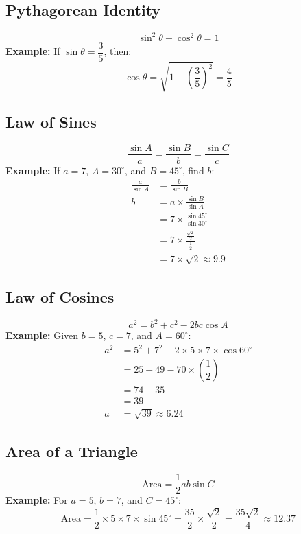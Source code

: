 \documentclass{article}
\begin{document}
\begin{multicols}{2}
\subsection*{Pythagorean Identity}
\[
\sin^2 \theta + \cos^2 \theta = 1
\]
\textbf{Example:} If \( \sin \theta = \dfrac{3}{5} \), then:
\[
\cos \theta = \sqrt{1 - \left( \dfrac{3}{5} \right)^2} = \dfrac{4}{5}
\]

\subsection*{Law of Sines}
\begin{center}
\end{center}
\[
\frac{\sin A}{a} = \frac{\sin B}{b} = \frac{\sin C}{c}
\]
\textbf{Example:} If \( a = 7 \), \( A = 30^\circ \), and \( B = 45^\circ \), find \( b \):
\begin{align*}
\frac{a}{\sin A} &= \frac{b}{\sin B} \\
b &= a \times \frac{\sin B}{\sin A} \\
&= 7 \times \frac{\sin 45^\circ}{\sin 30^\circ} \\
&= 7 \times \frac{\frac{\sqrt{2}}{2}}{\frac{1}{2}} \\
&= 7 \times \sqrt{2} \approx 9.9
\end{align*}

\subsection*{Law of Cosines}
\[
a^2 = b^2 + c^2 - 2bc \cos A
\]
\textbf{Example:} Given \( b = 5 \), \( c = 7 \), and \( A = 60^\circ \):
\begin{align*}
a^2 &= 5^2 + 7^2 - 2 \times 5 \times 7 \times \cos 60^\circ \\
&= 25 + 49 - 70 \times \left( \dfrac{1}{2} \right) \\
&= 74 - 35 \\
&= 39 \\
a &= \sqrt{39} \approx 6.24
\end{align*}

\subsection*{Area of a Triangle}
\[
\text{Area} = \dfrac{1}{2} ab \sin C
\]
\textbf{Example:} For \( a = 5 \), \( b = 7 \), and \( C = 45^\circ \):
\[
\text{Area} = \dfrac{1}{2} \times 5 \times 7 \times \sin 45^\circ = \dfrac{35}{2} \times \dfrac{\sqrt{2}}{2} = \dfrac{35\sqrt{2}}{4} \approx 12.37
\]

\end{multicols}
\end{document}

